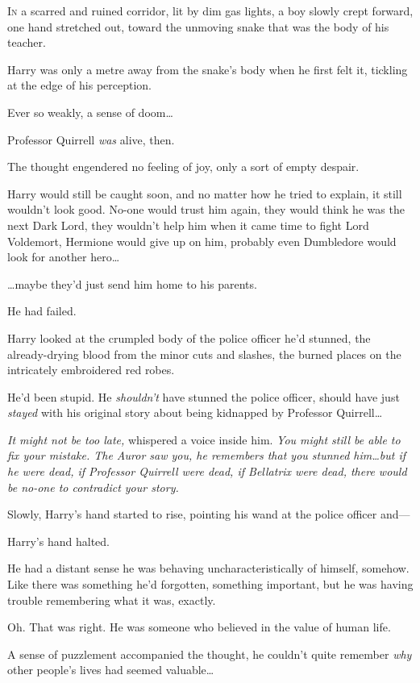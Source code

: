 
\lettrine{I}{n} a scarred and ruined corridor, lit by dim gas lights, a boy slowly crept forward, one hand stretched out, toward the unmoving snake that was the body of his teacher.

Harry was only a metre away from the snake’s body when he first felt it, tickling at the edge of his perception.

Ever so weakly, a sense of doom…

Professor Quirrell \emph{was} alive, then.

The thought engendered no feeling of joy, only a sort of empty despair.

Harry would still be caught soon, and no matter how he tried to explain, it still wouldn’t look good. No-one would trust him again, they would think he was the next Dark Lord, they wouldn’t help him when it came time to fight Lord Voldemort, Hermione would give up on him, probably even Dumbledore would look for another hero…

…maybe they’d just send him home to his parents.

He had failed.

Harry looked at the crumpled body of the police officer he’d stunned, the already-drying blood from the minor cuts and slashes, the burned places on the intricately embroidered red robes.

He’d been stupid. He \emph{shouldn’t} have stunned the police officer, should have just \emph{stayed} with his original story about being kidnapped by Professor Quirrell…

\emph{It might not be too late,} whispered a voice inside him. \emph{You might still be able to fix your mistake. The Auror saw you, he remembers that you stunned him…but if he were dead, if Professor Quirrell were dead, if Bellatrix were dead, there would be no-one to contradict your story.}

Slowly, Harry’s hand started to rise, pointing his wand at the police officer and—

Harry’s hand halted.

He had a distant sense he was behaving uncharacteristically of himself, somehow. Like there was something he’d forgotten, something important, but he was having trouble remembering what it was, exactly.

Oh. That was right. He was someone who believed in the value of human life.

A sense of puzzlement accompanied the thought, he couldn’t quite remember \emph{why} other people’s lives had seemed valuable…

